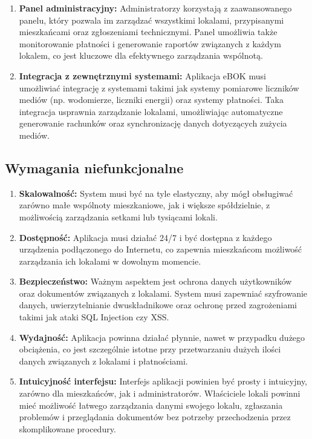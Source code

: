\begin{enumerate}[label=\arabic*.]
	\item \textbf{Panel administracyjny:} Administratorzy korzystają z zaawansowanego panelu, który pozwala im zarządzać wszystkimi lokalami, przypisanymi mieszkańcami oraz zgłoszeniami technicznymi. Panel umożliwia także monitorowanie płatności i generowanie raportów związanych z każdym lokalem, co jest kluczowe dla efektywnego zarządzania wspólnotą.
	
	\item \textbf{Integracja z zewnętrznymi systemami:} Aplikacja eBOK musi umożliwiać integrację z systemami takimi jak systemy pomiarowe liczników mediów (np. wodomierze, liczniki energii) oraz systemy płatności. Taka integracja usprawnia zarządzanie lokalami, umożliwiając automatyczne generowanie rachunków oraz synchronizację danych dotyczących zużycia mediów.
	
\end{enumerate}

\subsection{Wymagania niefunkcjonalne}

\begin{enumerate}[label=\arabic*.] 

	\item \textbf{Skalowalność:} System musi być na tyle elastyczny, aby mógł obsługiwać zarówno małe wspólnoty mieszkaniowe, jak i większe spółdzielnie, z możliwością zarządzania setkami lub tysiącami lokali.

	\item \textbf{Dostępność:} Aplikacja musi działać 24/7 i być dostępna z każdego urządzenia podłączonego do Internetu, co zapewnia mieszkańcom możliwość zarządzania ich lokalami w dowolnym momencie.

	\item \textbf{Bezpieczeństwo:} Ważnym aspektem jest ochrona danych użytkowników oraz dokumentów związanych z lokalami. System musi zapewniać szyfrowanie danych, uwierzytelnianie dwuskładnikowe oraz ochronę przed zagrożeniami takimi jak ataki SQL Injection czy XSS.

	\item \textbf{Wydajność:} Aplikacja powinna działać płynnie, nawet w przypadku dużego obciążenia, co jest szczególnie istotne przy przetwarzaniu dużych ilości danych związanych z lokalami i płatnościami.

	\item \textbf{Intuicyjność interfejsu:} Interfejs aplikacji powinien być prosty i intuicyjny, zarówno dla mieszkańców, jak i administratorów. Właściciele lokali powinni mieć możliwość łatwego zarządzania danymi swojego lokalu, zgłaszania problemów i przeglądania dokumentów bez potrzeby przechodzenia przez skomplikowane procedury.

\end{enumerate}
